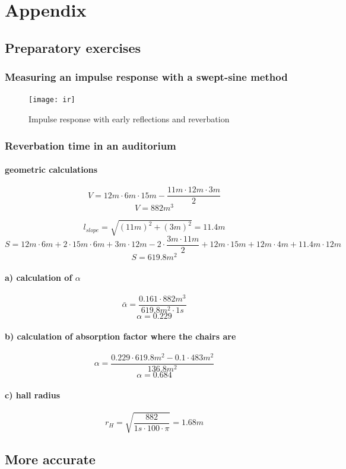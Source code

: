 \documentclass{article}
\begin{document}
\section{Appendix}
\subsection{Preparatory exercises}
	\subsubsection{Measuring an impulse response with a swept-sine method}
\begin{figure}[htbp]
\begin{center}
\texttt{[image: ir]}
\caption{Impulse response with early reflections and reverbation}
\label{irtheory}
\end{center}
\end{figure}

\subsubsection{Reverbation time in an auditorium}
\paragraph{geometric calculations}
$$V=12m\cdot 6m\cdot 15m - \frac{11m\cdot 12m\cdot 3m}{2}$$
$$V=882m^3$$

$$l_{slope}=\sqrt{(11m)^2+(3m)^2}=11.4m$$
$$S=12m\cdot 6m+2\cdot 15m\cdot 6m+3m\cdot 12m-2\cdot\frac{3m\cdot 11m}{2}+12m\cdot 15m+12m\cdot 4m+11.4m\cdot 12m$$
$$S=619.8m^2$$

\paragraph{a) calculation of $\alpha$}
$$\bar{\alpha}=\frac{0.161\cdot 882m^3}{619.8m^2\cdot 1s}$$
$$\alpha=0.229$$

\paragraph{b) calculation of absorption factor where the chairs are}
$$\alpha=\frac{0.229\cdot 619.8m^2-0.1\cdot 483m^2}{136.8m^2}$$
$$\alpha=0.684$$
\paragraph{c) hall radius}
$$r_H=\sqrt{\frac{882}{1s\cdot 100\cdot \pi}}=1.68m$$
\subsection{More accurate}
\end{document}
